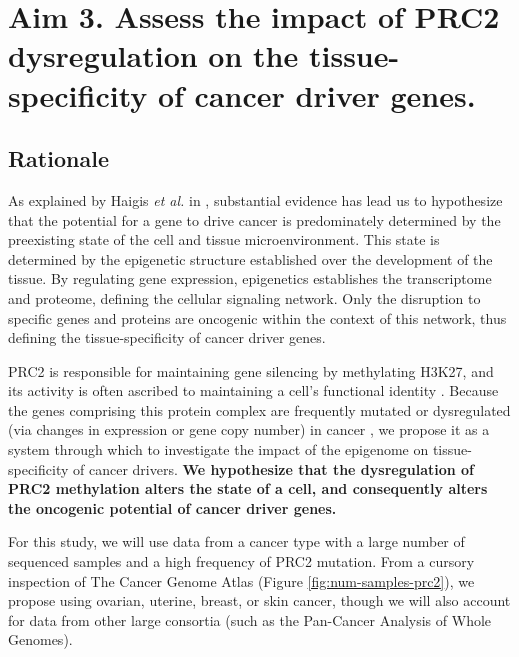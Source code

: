\section{Aim 3. Assess the impact of PRC2 dysregulation on the tissue-specificity of cancer driver genes.}

\subsection*{Rationale}

As explained by Haigis \emph{et al.} in \cite{Haigis2019}, substantial evidence has lead us to hypothesize that the potential for a gene to drive cancer is predominately determined by the preexisting state of the cell and tissue microenvironment.
This state is determined by the epigenetic structure established over the development of the tissue.
By regulating gene expression, epigenetics establishes the transcriptome and proteome, defining the cellular signaling network.
Only the disruption to specific genes and proteins are oncogenic within the context of this network, thus defining the tissue-specificity of cancer driver genes.

PRC2 is responsible for maintaining gene silencing by methylating H3K27, and its activity is often ascribed to maintaining a cell's functional identity \cite{Comet2016MaintainingCancer., Laugesen2019a}.
Because the genes comprising this protein complex are frequently mutated or dysregulated (via changes in expression or gene copy number) in cancer \cite{Wassef2017, Comet2016MaintainingCancer.}, we propose it as a system through which to investigate the impact of the epigenome on tissue-specificity of cancer drivers.
\textbf{We hypothesize that the dysregulation of PRC2 methylation alters the state of a cell, and consequently alters the oncogenic potential of cancer driver genes.}

For this study, we will use data from a cancer type with a large number of sequenced samples and a high frequency of PRC2 mutation.
From a cursory inspection of The Cancer Genome Atlas (Figure \ref{fig:num-samples-prc2}), we propose using ovarian, uterine, breast, or skin cancer, though we will also account for data from other large consortia (such as the Pan-Cancer Analysis of Whole Genomes).

